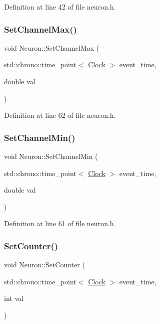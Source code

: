 Definition at line 42 of file neuron.\+h.

\mbox{\label{class_neuron_aed1ba99e24b905cd91a519c33b5a62b0}} 
\subsubsection{\texorpdfstring{Set\+Channel\+Max()}{SetChannelMax()}}
{\footnotesize\ttfamily void Neuron\+::\+Set\+Channel\+Max (\begin{DoxyParamCaption}\item[{std\+::chrono\+::time\+\_\+point$<$ \hyperlink{universe_8h_a0ef8d951d1ca5ab3cfaf7ab4c7a6fd80}{Clock} $>$}]{event\+\_\+time,  }\item[{double}]{val }\end{DoxyParamCaption})\hspace{0.3cm}{\ttfamily [inline]}}



Definition at line 62 of file neuron.\+h.

\mbox{\label{class_neuron_ae463ad8173c63e7970a5f4594667d481}} 
\subsubsection{\texorpdfstring{Set\+Channel\+Min()}{SetChannelMin()}}
{\footnotesize\ttfamily void Neuron\+::\+Set\+Channel\+Min (\begin{DoxyParamCaption}\item[{std\+::chrono\+::time\+\_\+point$<$ \hyperlink{universe_8h_a0ef8d951d1ca5ab3cfaf7ab4c7a6fd80}{Clock} $>$}]{event\+\_\+time,  }\item[{double}]{val }\end{DoxyParamCaption})\hspace{0.3cm}{\ttfamily [inline]}}



Definition at line 61 of file neuron.\+h.

\mbox{\label{class_neuron_a92f942f6f0bd783c39bb550cf4bb8fd0}} 
\subsubsection{\texorpdfstring{Set\+Counter()}{SetCounter()}}
{\footnotesize\ttfamily void Neuron\+::\+Set\+Counter (\begin{DoxyParamCaption}\item[{std\+::chrono\+::time\+\_\+point$<$ \hyperlink{universe_8h_a0ef8d951d1ca5ab3cfaf7ab4c7a6fd80}{Clock} $>$}]{event\+\_\+time,  }\item[{int}]{val }\end{DoxyParamCaption})\hspace{0.3cm}{\ttfamily [inline]}}




